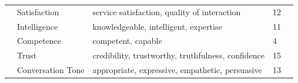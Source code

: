 \documentclass[sigconf,screen,review, anonymous]{acmart}
\newcommand{\cmt}[1]{}%
\begin{document}
\begin{table}[ht]
{\begin{tabular}{@{}p{3.1cm} | p{2cm} | p{4cm} | p{1.5cm} | p{6cm} @{}}
\\ \cline{2-5}
    & Satisfaction & service satisfaction, quality of interaction & 12
    & \cite{ceha2022expressive}\cmt{[77]}
    \cite{choi2020nobody}\cmt{[54]}
    \cite{diederich2019emulating}\cmt{[25]}
    \cite{elsholz2019exploring}\cmt{[61]}
    \cite{habler2019effects}\cmt{[63]}
    \cite{gnewuch2018faster}\cmt{[19]}
    \cite{hoegen2019end}\cmt{[31]}
    \cite{hu2022polite}\cmt{[76]}
    \cite{ma2022ask}\cmt{[29]}
    \cite{roy2021users}\cmt{[71]}
    \cite{wilhelm2022keep}\cmt{[28]}
    \cite{yang2017perceived}\cmt{[44]}
\\ \Xhline{1.2pt} 
\multirow{3}{*}{\parbox{3cm}{Perception of Agent's Ability}}
    & Intelligence & knowledgeable, intelligent, expertise & 11
    & \cite{ashktorab2019resilient}\cmt{[88]}
    \cite{ceha2021can}\cmt{[57]}
    \cite{chan2021kinvoices}\cmt{[74]}
    \cite{cuadra2021my}\cmt{[67]}
    \cite{dubiel2020persuasive}\cmt{[60]}
    \cite{feijoo2021effects}\cmt{[70]}
    \cite{hu2021enhancing}\cmt{[56]}
    \cite{jeong2019exploring}\cmt{[10]}
    \cite{spillner2021talk}\cmt{[18]}
    \cite{volkel2022user}\cmt{[75]}
    \cite{yang2017perceived}\cmt{[44]} 
\\ \cline{2-5}
    & Competence & competent, capable & 4 
    & \cite{cox2022does}\cmt{[27]}
    \cite{kraus2020effects}\cmt{[64]}
    \cite{lee2019s}\cmt{[55]}
    \cite{westerman2019believe}\cmt{[9]}
\\ \cline{2-5}
    & Trust & credibility, trustworthy, truthfulness, confidence & 15
    & \cite{andrews2012system}\cmt{[38]}
    \cite{chan2021kinvoices}\cmt{[74]}
    \cite{dubiel2020persuasive}\cmt{[60]}
    \cite{fadhil2018effect}\cmt{[52]}
    \cite{healey2013relating}\cmt{[39]}
    \cite{hoegen2019end}\cmt{[31]}
    \cite{huiyang2022improving}\cmt{[17]}
    \cite{jestin2022effects}\cmt{[81]}
    \cite{kraus2020effects}\cmt{[64]}
    \cite{lee2020hear}\cmt{[23]}
    \cite{linnemann2018can}\cmt{[15]}
    \cite{ma2022ask}\cmt{[29]}
    \cite{seeger2021chatbots}\cmt{[35]}
    \cite{tolmeijer2021female}\cmt{[62]}
    \cite{wilhelm2022keep}\cmt{[28]}    
\\ \Xhline{1.2pt} 
\multirow{3}{*}{\parbox{3cm}{Perception of Social Connection with Agent}}
    & Conversation Tone & appropriate, expressive, empathetic, persuasive & 13 
    & \cite{chan2021kinvoices}\cmt{[74]}
    \cite{cox2022does}\cmt{[27]}
    \cite{cuadra2021my}\cmt{[67]}
    \cite{daher2020empathic}\cmt{[58]}
    \cite{diederich2019emulating}\cmt{[25]}
    \cite{dubiel2020persuasive}\cmt{[60]}
    \cite{hu2021enhancing}\cmt{[56]}

\end{tabular}}
\end{table}
\end{document}
